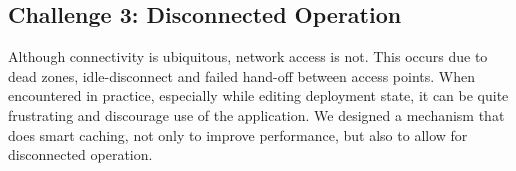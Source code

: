 






\subsection{Challenge 3: Disconnected Operation}
Although connectivity is ubiquitous, network access is not.  This occurs due to dead zones, 
idle-disconnect and failed hand-off between access points.  When encountered in practice, especially while editing
deployment state, it can be quite frustrating and discourage use of the application.  We designed a
mechanism that does smart caching, not only to improve performance, but also to allow for disconnected operation.





